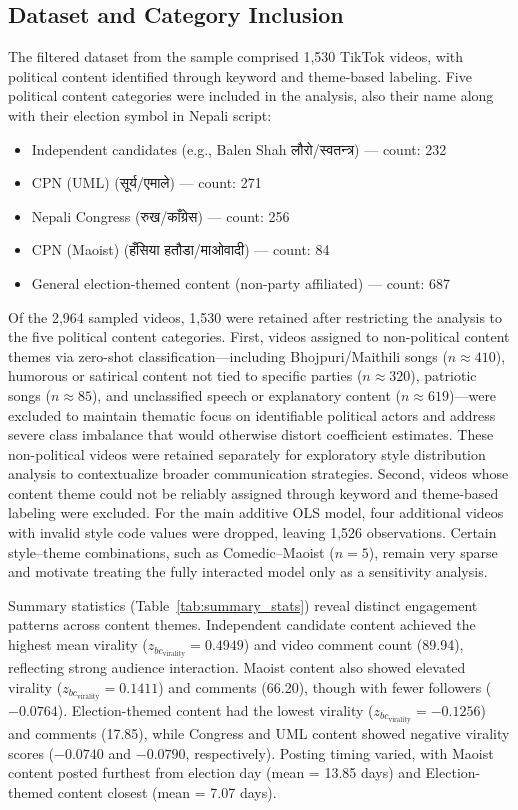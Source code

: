 \documentclass[12pt,a4paper]{report}
\begin{document}
\subsection{Dataset and Category Inclusion}
The filtered dataset from the sample comprised 1,530 TikTok videos, with political content identified through keyword and theme-based labeling. Five political content categories were included in the analysis, also their name along with their election symbol in Nepali script:
\begin{itemize}[noitemsep]
    \item Independent candidates (e.g., Balen Shah \texthindi{लौरो/स्वतन्त्र}) — count: 232
    \item CPN (UML) (\texthindi{सूर्य/एमाले}) — count: 271
    \item Nepali Congress (\texthindi{रुख/काँग्रेस}) — count: 256
    \item CPN (Maoist) (\texthindi{हँसिया हतौडा/माओवादी}) — count: 84
    \item General election-themed content (non-party affiliated) — count: 687
\end{itemize}
\newpage
Of the 2,964 sampled videos, 1,530 were retained after restricting the analysis to the five political content categories. First, videos assigned to non-political content themes via zero-shot classification---including Bhojpuri/Maithili songs ($n \approx 410$), humorous or satirical content not tied to specific parties ($n \approx 320$), patriotic songs ($n \approx 85$), and unclassified speech or explanatory content ($n \approx 619$)---were excluded to maintain thematic focus on identifiable political actors and address severe class imbalance that would otherwise distort coefficient estimates. These non-political videos were retained separately for exploratory style distribution analysis to contextualize broader communication strategies. Second, videos whose content theme could not be reliably assigned through keyword and theme-based labeling were excluded. For the main additive OLS model, four additional videos with invalid style code values were dropped, leaving 1,526 observations. Certain style--theme combinations, such as Comedic--Maoist (\( n = 5 \)), remain very sparse and motivate treating the fully interacted model only as a sensitivity analysis.

Summary statistics (Table~\ref{tab:summary_stats}) reveal distinct engagement patterns across content themes. Independent candidate content achieved the highest mean virality ($z_{bc_{\text{virality}}} = 0.4949$) and video comment count (89.94), reflecting strong audience interaction. Maoist content also showed elevated virality ($z_{bc_{\text{virality}}} = 0.1411$) and comments (66.20), though with fewer followers ($-0.0764$). Election-themed content had the lowest virality ($z_{bc_{\text{virality}}} = -0.1256$) and comments (17.85), while Congress and UML content showed negative virality scores ($-0.0740$ and $-0.0790$, respectively). Posting timing varied, with Maoist content posted furthest from election day (mean = 13.85 days) and Election-themed content closest (mean = 7.07 days).
\end{document}
